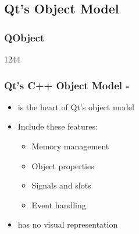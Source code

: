 %
%
%
%

\subsection{Qt's Object Model}

\subsubsection{QObject}
\begin{slide}{1244}
  \frametitle{Qt's C++ Object Model - }
  \begin{itemize}
  \item {} is the heart of Qt's object model
  \item Include these features:
    \begin{itemize}
    \item Memory management
    \item Object properties
    \item Signals and slots
    \item Event handling
   \end{itemize}
  \item {} has no visual representation

 \end{itemize}
\end{slide}


